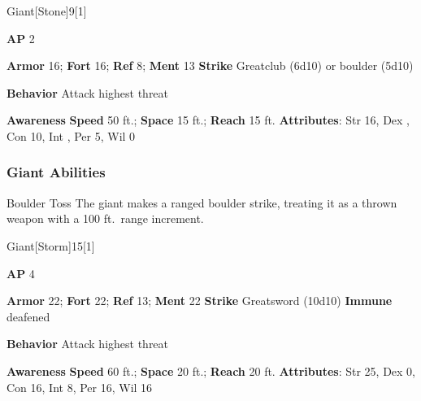 \begin{monsection}{Giant}[Stone]{9}[1]
\vspace{-1em}\vspace{-1em}
\begin{spellcontent}
\begin{spelltargetinginfo}
{\textbf{AP} 2}

\pari \textbf{Armor} 16;
\textbf{Fort} 16;
\textbf{Ref} 8;
\textbf{Ment} 13
\pari \textbf{Strike} Greatclub  (6d10) or boulder  (5d10)



\pari \textbf{Behavior} Attack highest threat
\end{spelltargetinginfo}
\end{spellcontent}

\begin{monsterfooter}
\pari \textbf{Awareness} 
\pari \textbf{Speed} 50 ft.;
\textbf{Space} 15 ft.;
\textbf{Reach} 15 ft.
\pari \textbf{Attributes}:
Str 16,
Dex ,
Con 10,
Int ,
Per 5,
Wil 0
\end{monsterfooter}
\end{monsection}


\subsubsection{Giant Abilities}

\begin{freeability}{Boulder Toss}
The giant makes a ranged boulder strike, treating it as a thrown weapon with a 100 ft.\ range increment.
\end{freeability}

\begin{monsection}{Giant}[Storm]{15}[1]
\vspace{-1em}\vspace{-1em}
\begin{spellcontent}
\begin{spelltargetinginfo}
{\textbf{AP} 4}

\pari \textbf{Armor} 22;
\textbf{Fort} 22;
\textbf{Ref} 13;
\textbf{Ment} 22
\pari \textbf{Strike} Greatsword  (10d10)
\pari \textbf{Immune} deafened


\pari \textbf{Behavior} Attack highest threat
\end{spelltargetinginfo}
\end{spellcontent}

\begin{monsterfooter}
\pari \textbf{Awareness} 
\pari \textbf{Speed} 60 ft.;
\textbf{Space} 20 ft.;
\textbf{Reach} 20 ft.
\pari \textbf{Attributes}:
Str 25,
Dex 0,
Con 16,
Int 8,
Per 16,
Wil 16
\end{monsterfooter}
\end{monsection}


